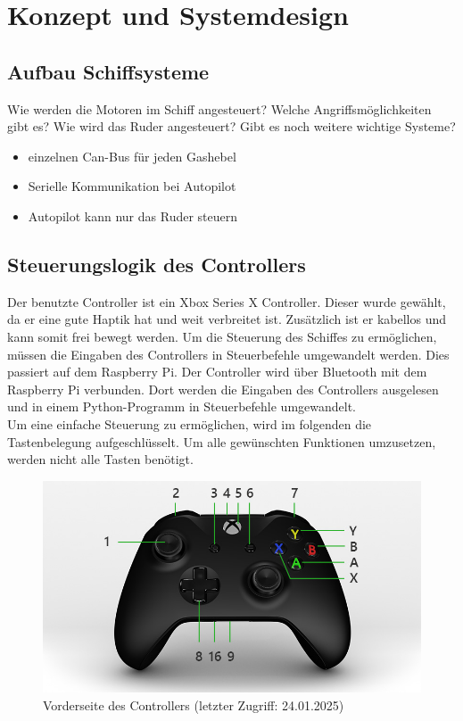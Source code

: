 \chapter{Konzept und Systemdesign}

\section{Aufbau Schiffsysteme}
Wie werden die Motoren im Schiff angesteuert?
Welche Angriffsmöglichkeiten gibt es?
Wie wird das Ruder angesteuert?
Gibt es noch weitere wichtige Systeme?
\begin{itemize}
    \item einzelnen Can-Bus für jeden Gashebel
    \item Serielle Kommunikation bei Autopilot
    \item Autopilot kann nur das Ruder steuern
\end{itemize}

\section{Steuerungslogik des Controllers}
Der benutzte Controller ist ein Xbox Series X Controller. Dieser wurde gewählt, da er eine gute Haptik hat und weit
verbreitet ist. Zusätzlich ist er kabellos und kann somit frei bewegt werden. Um die Steuerung des Schiffes zu
ermöglichen, müssen die Eingaben des Controllers in Steuerbefehle umgewandelt werden. Dies passiert auf dem 
Raspberry Pi. Der Controller wird über Bluetooth mit dem Raspberry Pi verbunden. Dort werden die Eingaben des Controllers
ausgelesen und in einem Python-Programm in Steuerbefehle umgewandelt. \\
Um eine einfache Steuerung zu ermöglichen, wird im folgenden die Tastenbelegung aufgeschlüsselt.
Um alle gewünschten Funktionen umzusetzen, werden nicht alle Tasten benötigt. 

\begin{figure}[H]
    \centering
    \includegraphics[scale=0.5]{images/vorderseite.jpg}
    \caption{Vorderseite des Controllers \cite{XboxController}(letzter Zugriff: 24.01.2025)}
    \label{fig:vorderseite}
\end{figure}

